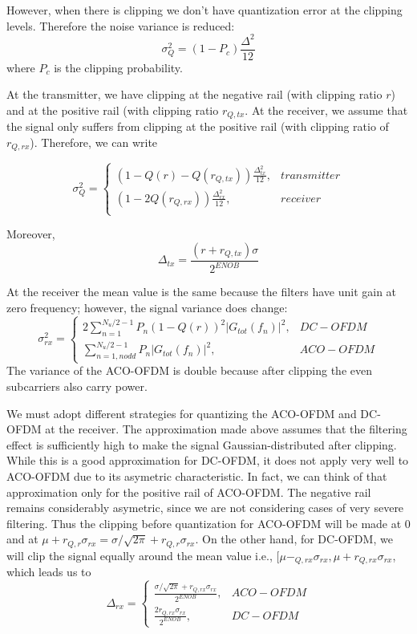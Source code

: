 \documentclass[a4paper]{article}
\begin{document}
However, when there is clipping we don't have quantization error at the clipping levels. Therefore the noise variance is reduced:
\begin{equation}
\sigma^2_Q = (1-P_c)\frac{\Delta^2}{12}
\end{equation}
where $P_c$ is the clipping probability.

At the transmitter, we have clipping at the negative rail (with clipping ratio $r$) and at the positive rail (with clipping ratio $r_{Q,tx}$. At the receiver, we assume that the signal only suffers from clipping at the positive rail (with clipping ratio of $r_{Q,rx}$). Therefore, we can write

\begin{equation}
\sigma^2_Q = \begin{cases}
(1-Q(r)-Q(r_{Q,tx}))\frac{\Delta_{tx}^2}{12}, & transmitter \\
(1-2Q(r_{Q,rx}))\frac{\Delta_{rx}^2}{12}, & receiver \\
\end{cases}
\end{equation}

Moreover, 
\begin{equation}
\Delta_{tx} = \frac{(r + r_{Q,tx})\sigma}{2^{ENOB}}
\end{equation}


At the receiver the mean value is the same because the filters have unit gain at zero frequency; however, the signal variance does change:
\begin{equation}
\sigma_{rx}^2 = \begin{cases}
2\sum_{n = 1}^{N_u/2-1}P_n(1-Q(r))^2|G_{tot}(f_n)|^2, & DC-OFDM \\
\sum_{n = 1, n odd}^{N_u/2-1}P_n|G_{tot}(f_n)|^2, & ACO-OFDM
\end{cases}
\end{equation}
The variance of the ACO-OFDM is double because after clipping the even subcarriers also carry power.

We must adopt different strategies for quantizing the ACO-OFDM and DC-OFDM at the receiver. The approximation made above assumes that the filtering effect is sufficiently high to make the signal Gaussian-distributed after clipping. While this is a good approximation for DC-OFDM, it does not apply very well to ACO-OFDM due to its asymetric characteristic. In fact, we can think of that approximation only for the positive rail of ACO-OFDM. The negative rail remains considerably asymetric, since we are not considering cases of very severe filtering. Thus the clipping before quantization for ACO-OFDM will be made at 0 and at $\mu + r_{Q,r}\sigma_{rx} = \sigma/\sqrt{2\pi} + r_{Q,r}\sigma_{rx}$. On the other hand, for DC-OFDM, we will clip the signal equally around the mean value i.e., $[\mu - _{Q,rx}\sigma_{rx}, \mu + r_{Q,rx}\sigma_{rx}$, which leads us to
\begin{equation}
\Delta_{rx} = \begin{cases}
\frac{\sigma/\sqrt{2\pi} + r_{Q,rx}\sigma_{rx}}{2^{ENOB}}, & ACO-OFDM \\
\frac{2r_{Q,rx}\sigma_{rx}}{2^{ENOB}}, & DC-OFDM 
\end{cases}
\end{equation}
\end{document}
